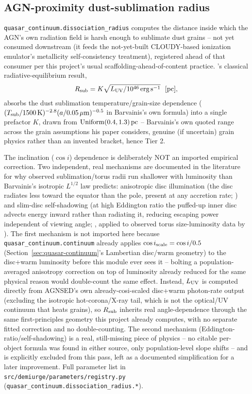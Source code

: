 \documentclass{aastex7}
\begin{document}
\subsection{AGN-proximity dust-sublimation radius}
\label{sec:dissociation-radius}

\texttt{quasar\_continuum.dissociation\_radius} computes the distance
inside which the AGN's own radiation field is harsh enough to sublimate
dust grains -- not yet consumed downstream (it feeds the not-yet-built
CLOUDY-based ionization emulator's metallicity self-consistency
treatment), registered ahead of that consumer per this project's usual
scaffolding-ahead-of-content practice. \citet{Barvainis1987}'s classical
radiative-equilibrium result,
\begin{equation}
    R_{\rm sub} = K \sqrt{L_{\rm UV} / 10^{46}\,{\rm erg\,s^{-1}}}\ \ [{\rm pc}],
\end{equation}
absorbs the dust sublimation temperature/grain-size dependence
($(T_{\rm sub}/1500\,{\rm K})^{-2.8}(a/0.05\,\mu{\rm m})^{-0.5}$ in
Barvainis's own formula) into a single prefactor $K$, drawn from
$\mathrm{Uniform}(0.4, 1.3)\,{\rm pc}$ -- Barvainis's own quoted range
across the grain assumptions his paper considers, genuine (if uncertain)
grain physics rather than an invented bracket, hence Tier 2.

The inclination ($\cos i$) dependence is deliberately NOT an imported
empirical correction. Two independent, real mechanisms are documented in
the literature for why observed sublimation/torus radii run shallower
with luminosity than Barvainis's isotropic $L^{1/2}$ law predicts:
anisotropic disc illumination (the disc radiates less toward the equator
than the pole, present at any accretion rate; \citealt{KawaguchiMori2010,
KawaguchiMori2011,MinezakiEtAl2019}) and slim-disc self-shadowing (at high
Eddington ratio the puffed-up inner disc advects energy inward rather
than radiating it, reducing escaping power independent of viewing angle;
\citealt{WangEtAl2014}, applied to observed torus size-luminosity data by
\citealt{ChenEtAl2023}). The first mechanism is not imported here because
\texttt{quasar\_continuum.continuum} already applies
$\cos i_{\rm scale} = \cos i / 0.5$ (Section~\ref{sec:quasar-continuum}'s
Lambertian disc/warm geometry) to the disc+warm luminosity before this
module ever sees it -- bolting a population-averaged anisotropy
correction on top of luminosity already reduced for the same physical
reason would double-count the same effect. Instead, $L_{\rm UV}$ is
computed directly from AGNSED's own already-cosi-scaled disc+warm
photon-rate output (excluding the isotropic hot-corona/X-ray tail, which
is not the optical/UV continuum that heats grains), so $R_{\rm sub}$
inherits real angle-dependence through the same first-principles geometry
this project already computes, with no separate fitted correction and no
double-counting. The second mechanism (Eddington-ratio/self-shadowing) is
a real, still-missing piece of physics -- no citable per-object formula
was found in either source, only population-level slope shifts -- and is
explicitly excluded from this pass, left as a documented simplification
for a later improvement. Full parameter list in
\texttt{src/demiurge/parameters/registry.py}
(\texttt{quasar\_continuum.dissociation\_radius.*}).
\end{document}
